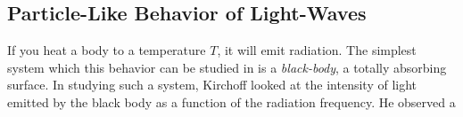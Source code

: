 \documentclass[a4paper]{scrartcl}
\begin{document}


\subsection{Particle-Like Behavior of Light-Waves}

If you heat a body to a temperature $T$, it will emit radiation.
The simplest system which this behavior can be studied in is a \emph{black-body}, a totally absorbing surface. In studying such a system, Kirchoff looked at the intensity of light emitted by the black body as a function of the radiation frequency. He observed a %
\end{document}
